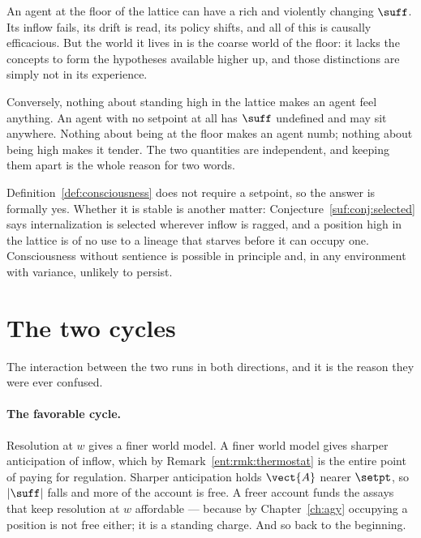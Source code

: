 \begin{remark}
\label{rmk:independent}
An agent at the floor of the lattice can have a rich and violently
changing $\suff$.
Its inflow fails, its drift is read, its policy shifts, and all of this
is causally efficacious.
But the world it lives in is the coarse world of the floor: it lacks the
concepts to form the hypotheses available higher up, and those
distinctions are simply not in its experience.

Conversely, nothing about standing high in the lattice makes an agent
feel anything.
An agent with no setpoint at all has $\suff$ undefined and may sit
anywhere.
Nothing about being at the floor makes an agent numb; nothing about being
high makes it tender.
The two quantities are independent, and keeping them apart is the whole
reason for two words.
\end{remark}

\begin{remark}
Definition~\ref{def:consciousness} does not require a setpoint, so the
answer is formally yes.
Whether it is stable is another matter:
Conjecture~\ref{suf:conj:selected} says internalization is selected
wherever inflow is ragged, and a position high in the lattice is of no use
to a lineage that starves before it can occupy one.
Consciousness without sentience is possible in principle and, in any
environment with variance, unlikely to persist.
\end{remark}

\section{The two cycles}
\label{sec:relationship}

The interaction between the two runs in both directions, and it is the
reason they were ever confused.

\paragraph{The favorable cycle.}
Resolution at $w$ gives a finer world model.
A finer world model gives sharper anticipation of inflow, which by
Remark~\ref{ent:rmk:thermostat} is the entire point of paying for
regulation.
Sharper anticipation holds $\vect{A}$ nearer $\setpt$, so $|\suff|$ falls
and more of the account is free.
A freer account funds the assays that keep resolution at $w$ affordable
--- because by Chapter~\ref{ch:agy} occupying a position is not free
either; it is a standing charge.
And so back to the beginning.

